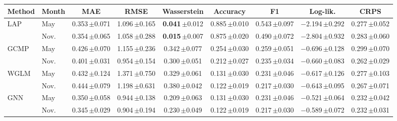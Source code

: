 \begin{table}[t]
\centering
\small
\setlength{\tabcolsep}{3pt}
\begin{tabular}{llccccccc}
\toprule
Method & Month & MAE & RMSE & Wasserstein & Accuracy & F1 & Log-lik. & CRPS \\
\midrule
\multirow{2}{*}{LAP} & May & 0.353\,{\scriptsize$\pm$0.071} & 1.096\,{\scriptsize$\pm$0.165} & \textbf{0.041}\,{\scriptsize$\pm$0.012} & 0.885\,{\scriptsize$\pm$0.010} & 0.543\,{\scriptsize$\pm$0.097} & $-$2.194\,{\scriptsize$\pm$0.292} & 0.277\,{\scriptsize$\pm$0.052} \\
 & Nov. & 0.354\,{\scriptsize$\pm$0.065} & 1.058\,{\scriptsize$\pm$0.288} & \textbf{0.015}\,{\scriptsize$\pm$0.007} & 0.875\,{\scriptsize$\pm$0.020} & 0.490\,{\scriptsize$\pm$0.072} & $-$2.804\,{\scriptsize$\pm$0.932} & 0.283\,{\scriptsize$\pm$0.060} \\
\midrule
\multirow{2}{*}{GCMP} & May & 0.426\,{\scriptsize$\pm$0.070} & 1.155\,{\scriptsize$\pm$0.236} & 0.342\,{\scriptsize$\pm$0.077} & 0.254\,{\scriptsize$\pm$0.030} & 0.259\,{\scriptsize$\pm$0.051} & $-$0.696\,{\scriptsize$\pm$0.128} & 0.299\,{\scriptsize$\pm$0.070} \\
 & Nov. & 0.401\,{\scriptsize$\pm$0.031} & 0.954\,{\scriptsize$\pm$0.154} & 0.300\,{\scriptsize$\pm$0.051} & 0.212\,{\scriptsize$\pm$0.027} & 0.235\,{\scriptsize$\pm$0.034} & $-$0.660\,{\scriptsize$\pm$0.083} & 0.262\,{\scriptsize$\pm$0.029} \\
\midrule
\multirow{2}{*}{WGLM} & May & 0.432\,{\scriptsize$\pm$0.124} & 1.371\,{\scriptsize$\pm$0.750} & 0.329\,{\scriptsize$\pm$0.061} & 0.131\,{\scriptsize$\pm$0.030} & 0.231\,{\scriptsize$\pm$0.046} & $-$0.617\,{\scriptsize$\pm$0.126} & 0.277\,{\scriptsize$\pm$0.103} \\
 & Nov. & 0.444\,{\scriptsize$\pm$0.079} & 1.198\,{\scriptsize$\pm$0.631} & 0.380\,{\scriptsize$\pm$0.042} & 0.122\,{\scriptsize$\pm$0.019} & 0.217\,{\scriptsize$\pm$0.030} & $-$0.643\,{\scriptsize$\pm$0.095} & 0.267\,{\scriptsize$\pm$0.071} \\
\midrule
\multirow{2}{*}{GNN} & May & 0.350\,{\scriptsize$\pm$0.058} & 0.944\,{\scriptsize$\pm$0.138} & 0.209\,{\scriptsize$\pm$0.063} & 0.131\,{\scriptsize$\pm$0.030} & 0.231\,{\scriptsize$\pm$0.046} & $-$0.521\,{\scriptsize$\pm$0.064} & 0.232\,{\scriptsize$\pm$0.042} \\
 & Nov. & 0.345\,{\scriptsize$\pm$0.029} & 0.904\,{\scriptsize$\pm$0.194} & 0.230\,{\scriptsize$\pm$0.049} & 0.122\,{\scriptsize$\pm$0.019} & 0.217\,{\scriptsize$\pm$0.030} & $-$0.589\,{\scriptsize$\pm$0.072} & 0.232\,{\scriptsize$\pm$0.031} \\

\end{tabular}
\end{table}
